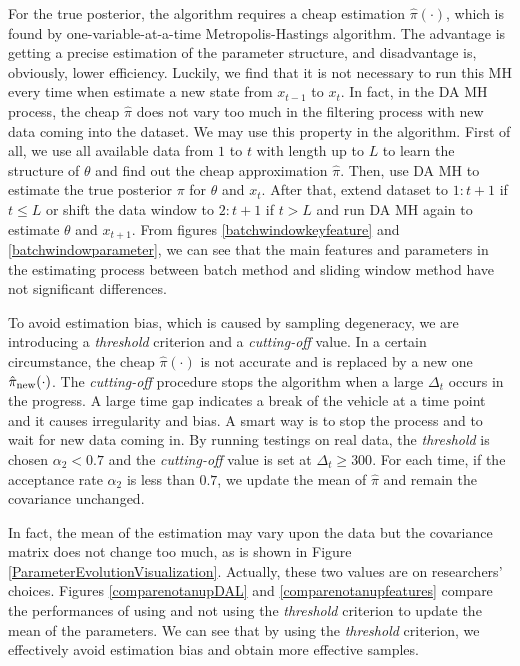 For the true posterior, the algorithm requires a cheap estimation $\hat{\pi}(\cdot)$, which is found by one-variable-at-a-time Metropolis-Hastings algorithm. The advantage is getting a precise estimation of the parameter structure, and disadvantage is, obviously, lower efficiency. Luckily, we find that it is not necessary to run this MH every time when estimate a new state from $x_{t-1}$ to $x_t$. In fact, in the DA MH process, the cheap $\hat{\pi}$ does not vary too much in the filtering process with new data coming into the dataset. We may use this property in the algorithm. First of all, we use all available data from $1$ to $t$ with length up to $L$ to learn the structure of $\theta$ and find out the cheap approximation $\hat{\pi}$. Then, use DA MH to estimate the true posterior $\pi$ for $\theta$ and $x_t$. After that, extend dataset to $1:t+1$ if $t\leq L$ or shift the data window to $2:t+1$ if $t>L$ and run DA MH again to estimate $\theta$ and $x_{t+1}$. From figures \ref{batchwindowkeyfeature} and \ref{batchwindowparameter}, we can see that the main features and parameters in the estimating process between batch method and sliding window method have not significant differences. 


To avoid estimation bias, which is caused by sampling degeneracy, we are introducing a \textit{threshold} criterion and a \textit{cutting-off} value. In a certain circumstance, the cheap $\hat{\pi}(\cdot)$ is not accurate and is replaced by a new one $\hat{\pi}_{\mbox{\scriptsize new}}(\cdot)$. The \textit{cutting-off} procedure stops the algorithm when a large $\Delta_t$ occurs in the progress. A large time gap indicates a break of the vehicle at a time point and it causes irregularity and bias. A smart way is to stop the process and to wait for new data coming in. By running testings on real data, the \textit{threshold} is chosen $\alpha_2<0.7$ and the \textit{cutting-off} value is set at $\Delta_t\geq 300$. For each time, if the acceptance rate $\alpha_2$ is less than $0.7$, we update the mean of $\hat{\pi}$ and remain the covariance unchanged. 


In fact, the mean of the estimation may vary upon the data but the covariance matrix does not change too much, as is shown in Figure \ref{ParameterEvolutionVisualization}. Actually, these two values are on researchers' choices. Figures \ref{comparenotanupDAL} and \ref{comparenotanupfeatures} compare the performances of using and not using the \textit{threshold} criterion to update the mean of the parameters. We can see that by using the \textit{threshold} criterion, we effectively avoid estimation bias and obtain more effective samples. 

